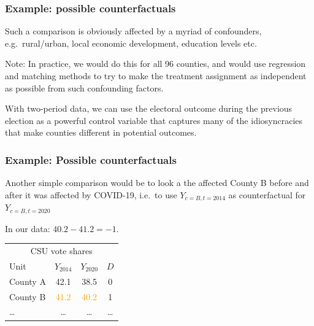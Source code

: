 \documentclass[12pt,english,dvipsnames,aspectratio=169,handout]{beamer}\usepackage[]{graphicx}\usepackage[]{xcolor}
\begin{document}
\begin{frame}
  \frametitle{Example: possible counterfactuals}
\footnotesize

Such a comparison is obviously affected by a myriad of confounders, e.g.\ rural/urban, local economic development, education levels etc.

\scriptsize
Note: In practice, we would do this for all 96 counties, and would use regression and matching methods to try to make the treatment assignment as independent as possible from such confounding factors. 

With two-period data, we can use the electoral outcome during the previous election as a powerful control variable that captures many of the idiosyncracies that make counties different in potential outcomes.  

\vspace{1cm}
\end{frame}




\begin{frame}
  \frametitle{Example: Possible counterfactuals}
\footnotesize

Another simple comparison would be to look a the affected County B before and after it was affected by COVID-19, i.e.\ to use $Y_{c=B,t=2014}$ as counterfactual for $Y_{c=B,t=2020}$

In our data: $40.2-41.2=-1$.

\scriptsize
\begin{table}\centering
\begin{tabular}{lccc}
\toprule
\multicolumn{4}{c}{CSU vote shares } \\
Unit    & $Y_{2014}$  & $Y_{2020}$  & $D$  \\
\midrule
County A &  42.1     &    38.5   & 0         \\
County B &  \textcolor{orange}{41.2}     &    \textcolor{orange}{40.2}    & 1       \\
\ldots  &   \ldots  &  \ldots   & \ldots    \\
\bottomrule
\end{tabular}
\end{table}

\end{frame}
\end{document}
